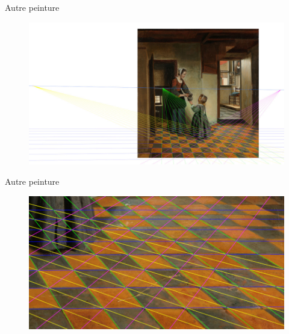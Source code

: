 \documentclass{beamer}
\begin{document}
	\begin{frame}{Autre peinture}
		\begin{figure}[h]
			\centering
			\includegraphics[width=\linewidth]{perf_bis.jpg}
		\end{figure}
	\end{frame}

	\begin{frame}{Autre peinture}
		\begin{figure}[h]
			\centering
			\includegraphics[width=\linewidth]{perf_bis_zoom.jpg}
		\end{figure}
	\end{frame}
\end{document}
